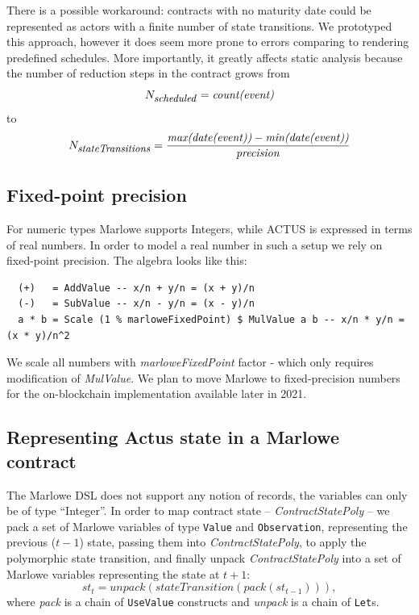 \documentclass[runningheads]{llncs}
\newcommand{\ident}[1]{\mbox{\emph{#1}}}
\begin{document}
There is a possible workaround: contracts with no maturity date
could be represented as actors with a finite number of state transitions.
We prototyped this approach, %
however it does
seem more prone to errors comparing to rendering predefined schedules.
More importantly, it greatly affects static analysis because the number
of reduction steps in the contract grows from 
\noindent 
\begin{equation*}
N_{\footnotesize \ident{scheduled}}=\ident{count(event)}
\end{equation*}
to 
\noindent 
\begin{equation}
N_{\footnotesize \ident{stateTransitions}}=\frac{\ident{max(date(event))}-\ident{min(date(event))}}{\ident{precision}} 
\end{equation}

\subsection{Fixed-point precision }

For numeric types Marlowe supports Integers, while ACTUS is expressed in terms
of real numbers. In order to model a real number in such a setup
we rely on fixed-point precision. The algebra looks like this: 
\begin{verbatim}
  (+)   = AddValue -- x/n + y/n = (x + y)/n
  (-)   = SubValue -- x/n - y/n = (x - y)/n
  a * b = Scale (1 % marloweFixedPoint) $ MulValue a b -- x/n * y/n = (x * y)/n^2
\end{verbatim}
We scale all numbers with \emph{marloweFixedPoint} factor - which only requires modification of \emph{MulValue}.
\noindent
We plan to move Marlowe to fixed-precision numbers for the on-blockchain implementation available later in 2021.

\subsection{Representing Actus state in a Marlowe contract}

The Marlowe DSL does not support any notion of records,
the variables can only be of type ``Integer''. In order to
map contract state -- \emph{ContractStatePoly} -- we pack a set of Marlowe
variables of type \texttt{Value} and \texttt{Observation}, representing the previous ($t-1$) state, passing them into
\emph{ContractStatePoly}, to apply the polymorphic state transition, and
finally unpack \emph{ContractStatePoly} into a set of Marlowe variables representing the 
 state at $t+1$:
\noindent 
\begin{equation}
st_{t}=unpack(stateTransition(pack(st_{t-1}))),
\end{equation}
\noindent
where \emph{pack} is a chain of \texttt{UseValue} constructs and \ident{unpack} is a chain of
\texttt{Let}s.
\end{document}
